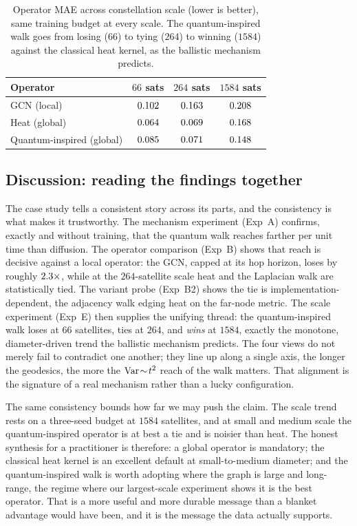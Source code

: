 \begin{table}[t]
\centering
\caption{Operator MAE across constellation scale (lower is better), same training budget
at every scale. The quantum-inspired walk goes from losing ($66$) to tying ($264$) to
winning ($1584$) against the classical heat kernel, as the ballistic mechanism predicts.}
\label{tab:scale}
\renewcommand{\arraystretch}{1.2}
\begin{tabular}{@{}lccc@{}}
\toprule
Operator & $66$ sats & $264$ sats & $1584$ sats \\
\midrule
GCN (local)               & $0.102$  & $0.163$  & $0.208$ \\
Heat (global)             & $0.064$ & \textbf{$0.069$} & $0.168$ \\
Quantum-inspired (global) & $0.085$   & $0.071$   & \textbf{$0.148$} \\
\bottomrule
\end{tabular}
\end{table}



\subsection{Discussion: reading the findings together}
The case study tells a consistent story across its parts, and the consistency is what
makes it trustworthy. The mechanism experiment (Exp~A) confirms, exactly and without
training, that the quantum walk reaches farther per unit time than diffusion. The
operator comparison (Exp~B) shows that reach is decisive against a local operator: the
GCN, capped at its hop horizon, loses by roughly $2.3\times$, while at the
$264$-satellite scale heat and the Laplacian walk are statistically tied. The variant
probe (Exp~B2) shows the tie is implementation-dependent, the adjacency walk edging heat
on the far-node metric. The scale experiment (Exp~E) then supplies the unifying thread:
the quantum-inspired walk loses at $66$ satellites, ties at $264$, and \emph{wins} at
$1584$, exactly the monotone, diameter-driven trend the ballistic mechanism predicts. The
four views do not merely fail to contradict one another; they line up along a single
axis, the longer the geodesics, the more the $\operatorname{Var}\!\sim\!t^2$ reach of the walk matters.
That alignment is the signature of a real mechanism rather than a lucky configuration.

The same consistency bounds how far we may push the claim. The scale trend rests on a
three-seed budget at $1584$ satellites, and at small and medium scale the quantum-inspired
operator is at best a tie and is noisier than heat. The honest synthesis for a
practitioner is therefore: a global operator is mandatory; the classical heat kernel is an
excellent default at small-to-medium diameter; and the quantum-inspired walk is worth
adopting where the graph is large and long-range, the regime where our largest-scale
experiment shows it is the best operator. That is a more useful and more durable message
than a blanket advantage would have been, and it is the message the data actually
supports.
